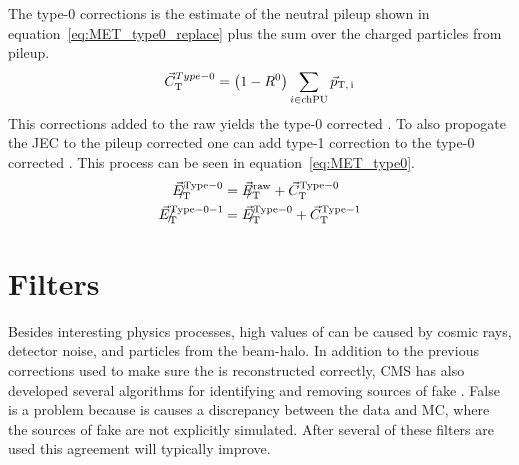 The type-0 corrections is the estimate of the neutral pileup shown in equation~\ref{eq:MET_type0_replace} plus the sum over the charged particles from pileup.
\begin{equation}
	\label{eq:MET_type0_correction}
\vec{C}_{\mathrm{T}}^{Type-0}=\left(1-R^{0}\right)\sum_{i \in \mathrm{chPU}}{\vec p}_{\mathrm{T,\,i}}
\end{equation}
This corrections added to the raw \VETslash yields the type-0 corrected \VETslash. To also propogate the JEC to the pileup corrected \VETslash one can add type-1 correction to the type-0 corrected \VETslash. This process can be seen in equation~\ref{eq:MET_type0}. 
\begin{equation}
\begin{aligned}
	\label{eq:MET_type0}
\VETslashsup{Type-0\hspace{-0.22em}}\hspace{0.37em}={}&\VETslashraw+\vec{C}_{\mathrm{T}}^{\mathrm{Type-0}} \\
\VETslashsupwide{Type-0-1}={}&\VETslashsup{Type-0\hspace{-0.22em}}\hspace{0.37em}+\vec{C}_{\mathrm{T}}^{\mathrm{Type-1}}
\end{aligned}
\end{equation}



\section{\VETslash Filters}
Besides interesting physics processes, high values of \ETslash can be caused by cosmic rays, detector noise, and particles from the beam-halo.
In addition to the previous corrections used to make sure the \VETslash is reconstructed correctly, CMS has also developed several algorithms for identifying and removing sources of fake \VETslash.
False \VETslash is a problem because is causes a discrepancy between the data and MC, where the sources of fake \VETslash are not explicitly simulated.
After several of these filters are used this agreement will typically improve.
